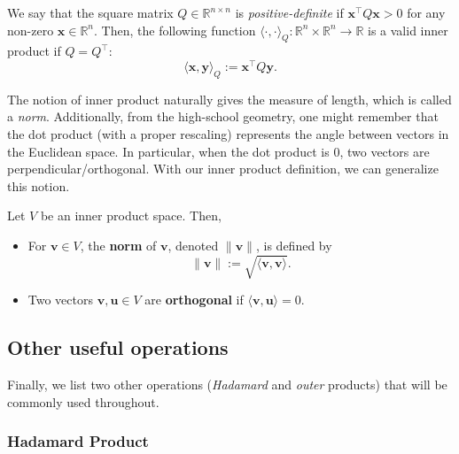 \documentclass[../../book.tex]{subfiles}
\begin{document}
\begin{example}
    We say that the square matrix $Q \in \mathbb{R}^{n \times n}$ is \textit{positive-definite} if $\mathbf{x}^{\top}Q\mathbf{x}>0$ for any non-zero $\mathbf{x} \in \mathbb{R}^n$.
    Then, the following function $\langle \cdot, \cdot \rangle_Q: \mathbb{R}^n \times \mathbb{R}^n \to \mathbb{R}$ is a valid inner product if $Q=Q^{\top}$:
    \begin{equation*}
        \langle \mathbf{x}, \mathbf{y} \rangle_Q := \mathbf{x}^{\top}Q\mathbf{y}.
    \end{equation*}
\end{example}

The notion of inner product naturally gives the measure of length, which is called a \textit{norm}.
Additionally, from the high-school geometry, one might remember that the dot product (with a proper rescaling) represents the angle between vectors in the Euclidean space.
In particular, when the dot product is $0$, two vectors are perpendicular/orthogonal. 
With our inner product definition, we can generalize this notion.

\begin{definition}\label{def:length}
    Let $V$ be an inner product space. Then,
    \begin{itemize}
        \item For $\mathbf{v} \in V$, the \textbf{norm} of $\mathbf{v}$, denoted $\|\mathbf{v}\|$, is defined by
        \begin{equation*}
            \|\mathbf{v}\| := \sqrt{\langle \mathbf{v}, \mathbf{v} \rangle}.
        \end{equation*}
        \item Two vectors $\mathbf{v},\mathbf{u} \in V$ are \textbf{orthogonal} if $\langle \mathbf{v}, \mathbf{u} \rangle = 0$.
    \end{itemize}
\end{definition}

\subsection{Other useful operations}

Finally, we list two other operations (\textit{Hadamard} and \textit{outer} products) that will be commonly used throughout.

\subsubsection{Hadamard Product}
\end{document}
